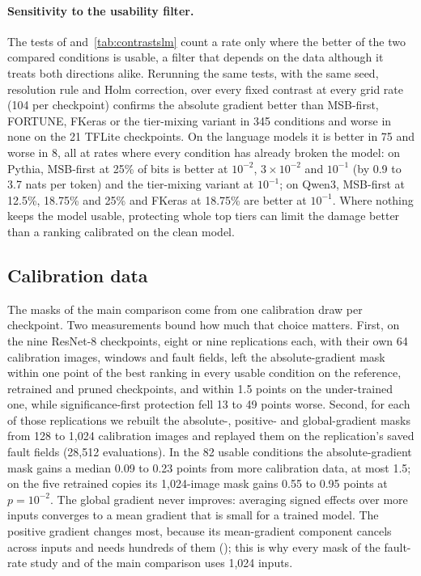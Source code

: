 \paragraph{Sensitivity to the usability filter.} The tests of  and~\ref{tab:contrastslm} count a rate only where the better of the two compared conditions is usable, a filter that depends on the data although it treats both directions alike. Rerunning the same tests, with the same seed, resolution rule and Holm correction, over every fixed contrast at every grid rate (104 per checkpoint) confirms the absolute gradient better than MSB-first, FORTUNE, FKeras or the tier-mixing variant in 345 conditions and worse in none on the 21 TFLite checkpoints. On the language models it is better in 75 and worse in 8, all at rates where every condition has already broken the model: on Pythia, MSB-first at 25\% of bits is better at $10^{-2}$, $3\times10^{-2}$ and $10^{-1}$ (by 0.9 to 3.7 nats per token) and the tier-mixing variant at $10^{-1}$; on Qwen3, MSB-first at 12.5\%, 18.75\% and 25\% and FKeras at 18.75\% are better at $10^{-1}$. Where nothing keeps the model usable, protecting whole top tiers can limit the damage better than a ranking calibrated on the clean model.

\subsection{Calibration data}\label{app:calibration}
The masks of the main comparison come from one calibration draw per checkpoint. Two measurements bound how much that choice matters. First, on the nine ResNet-8 checkpoints, eight or nine replications each, with their own 64 calibration images, windows and fault fields, left the absolute-gradient mask within one point of the best ranking in every usable condition on the reference, retrained and pruned checkpoints, and within 1.5 points on the under-trained one, while significance-first protection fell 13 to 49 points worse. Second, for each of those replications we rebuilt the absolute-, positive- and global-gradient masks from 128 to 1,024 calibration images and replayed them on the replication's saved fault fields (28,512 evaluations). In the 82 usable conditions the absolute-gradient mask gains a median 0.09 to 0.23 points from more calibration data, at most 1.5; on the five retrained copies its 1,024-image mask gains 0.55 to 0.95 points at $p=10^{-2}$. The global gradient never improves: averaging signed effects over more inputs converges to a mean gradient that is small for a trained model. The positive gradient changes most, because its mean-gradient component cancels across inputs and needs hundreds of them (); this is why every mask of the fault-rate study and of the main comparison uses 1,024 inputs.

